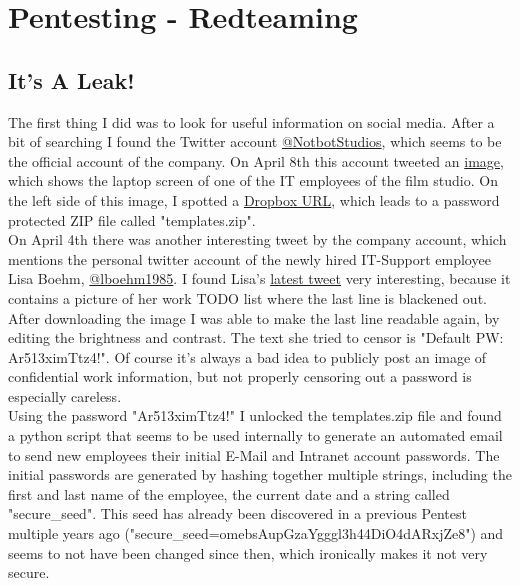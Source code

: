 \section{Pentesting - Redteaming}

\subsection{It's A Leak!}
The first thing I did was to look for useful information on social media. After a bit of searching I found the Twitter account \href{https://twitter.com/notbotstudios}{@NotbotStudios}, which seems to be the official account of the company. On April 8th this account tweeted an \href{https://twitter.com/NotbotStudios/status/1247844703162294272}{image}, which shows the laptop screen of one of the IT employees of the film studio. On the left side of this image, I spotted a \href{https://www.dropbox.com/s/cmopqfl4iwpfwz5/}{Dropbox URL}, which leads to a password protected ZIP file called "templates.zip". \\

On April 4th there was another interesting tweet by the company account, which mentions the personal twitter account of the newly hired IT-Support employee Lisa Boehm, \href{https://twitter.com/lboehm1985}{@lboehm1985}. I found Lisa's \href{https://twitter.com/lboehm1985/status/1248692516083445761}{latest tweet} very interesting, because it contains a picture of her work TODO list where the last line is blackened out. After downloading the image I was able to make the last line readable again, by editing the brightness and contrast. The text she tried to censor is "Default PW: Ar513ximTtz4!". Of course it's always a bad idea to publicly post an image of confidential work information, but not properly censoring out a password is especially careless. \\

Using the password "Ar513ximTtz4!" I unlocked the templates.zip file and found a python script that seems to be used internally to generate an automated email to send new employees their initial E-Mail and Intranet account passwords. The initial passwords are generated by hashing together multiple strings, including the first and last name of the employee, the current date and a string called "secure\_seed". This seed has already been discovered in a previous Pentest multiple years ago ("secure\_seed=\allowbreak omebsAupGzaYgggl3h44DiO4dARxjZe8") and seems to not have been changed since then, which ironically makes it not very secure. \\

